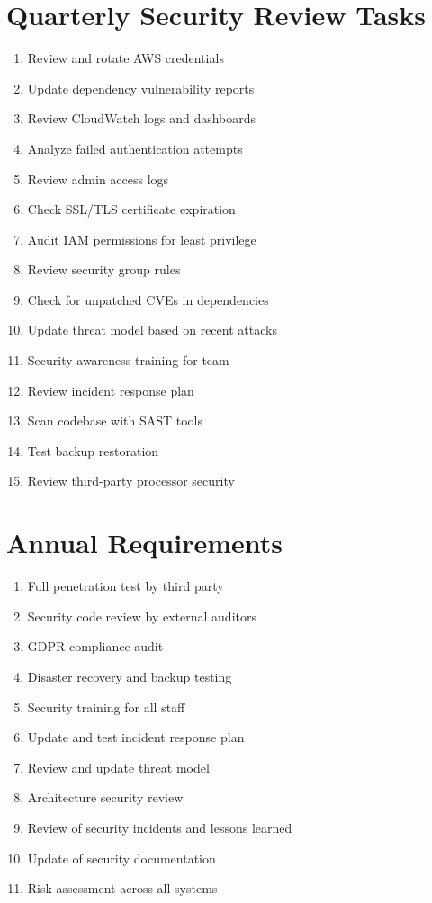 \documentclass{report}
\begin{document}
\section{Quarterly Security Review Tasks}

\begin{enumerate}
\item Review and rotate AWS credentials
\item Update dependency vulnerability reports
\item Review CloudWatch logs and dashboards
\item Analyze failed authentication attempts
\item Review admin access logs
\item Check SSL/TLS certificate expiration
\item Audit IAM permissions for least privilege
\item Review security group rules
\item Check for unpatched CVEs in dependencies
\item Update threat model based on recent attacks
\item Security awareness training for team
\item Review incident response plan
\item Scan codebase with SAST tools
\item Test backup restoration
\item Review third-party processor security
\end{enumerate}

\section{Annual Requirements}

\begin{enumerate}
\item Full penetration test by third party
\item Security code review by external auditors
\item GDPR compliance audit
\item Disaster recovery and backup testing
\item Security training for all staff
\item Update and test incident response plan
\item Review and update threat model
\item Architecture security review
\item Review of security incidents and lessons learned
\item Update of security documentation
\item Risk assessment across all systems
\end{enumerate}
\end{document}
